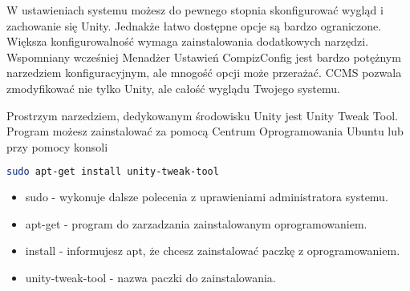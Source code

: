 W \textcolor{ubuntu_orange}{ustawieniach systemu} możesz do pewnego stopnia skonfigurować wygląd i zachowanie się Unity. Jednakże łatwo dostępne opcje są bardzo ograniczone. Większa konfigurowalność wymaga zainstalowania dodatkowych narzędzi. Wspomniany wcześniej Menadżer Ustawień CompizConfig jest bardzo potężnym narzedziem konfiguracyjnym, ale mnogość opcji może przerażać. CCMS pozwala zmodyfikować nie tylko Unity, ale całość wyglądu Twojego systemu.

Prostrzym narzedziem, dedykowanym środowisku Unity jest \textcolor{ubuntu_orange}{Unity Tweak Tool}. Program możesz zainstalować za pomocą Centrum Oprogramowania Ubuntu lub przy pomocy konsoli
\begin{lstlisting}[language=bash]
sudo apt-get install unity-tweak-tool
\end{lstlisting}
\begin{itemize}
\item \textcolor{ubuntu_orange}{sudo} - wykonuje dalsze polecenia z uprawieniami administratora systemu.
\item \textcolor{ubuntu_orange}{apt-get} - program do zarzadzania zainstalowanym oprogramowaniem.
\item \textcolor{ubuntu_orange}{install} - informujesz apt, że chcesz zainstalować paczkę z oprogramowaniem.
\item \textcolor{ubuntu_orange}{unity-tweak-tool} - nazwa paczki do zainstalowania.
\end{itemize}